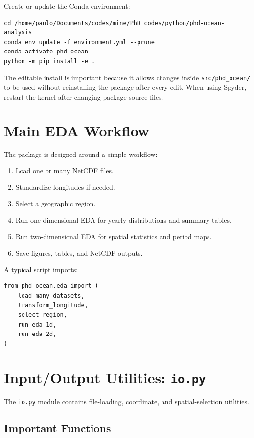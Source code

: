 \documentclass[11pt,a4paper]{article}
\begin{document}
Create or update the Conda environment:

\begin{lstlisting}[style=bashstyle]
cd /home/paulo/Documents/codes/mine/PhD_codes/python/phd-ocean-analysis
conda env update -f environment.yml --prune
conda activate phd-ocean
python -m pip install -e .
\end{lstlisting}

The editable install is important because it allows changes inside \texttt{src/phd\_ocean/}
to be used without reinstalling the package after every edit. When using Spyder, restart the
kernel after changing package source files.

\section{Main EDA Workflow}

The package is designed around a simple workflow:

\begin{enumerate}[label=\arabic*.]
    \item Load one or many NetCDF files.
    \item Standardize longitudes if needed.
    \item Select a geographic region.
    \item Run one-dimensional EDA for yearly distributions and summary tables.
    \item Run two-dimensional EDA for spatial statistics and period maps.
    \item Save figures, tables, and NetCDF outputs.
\end{enumerate}

A typical script imports:

\begin{lstlisting}[style=pythonstyle]
from phd_ocean.eda import (
    load_many_datasets,
    transform_longitude,
    select_region,
    run_eda_1d,
    run_eda_2d,
)
\end{lstlisting}

\section{Input/Output Utilities: \texttt{io.py}}

The \texttt{io.py} module contains file-loading, coordinate, and spatial-selection utilities.

\subsection{Important Functions}
\end{document}
